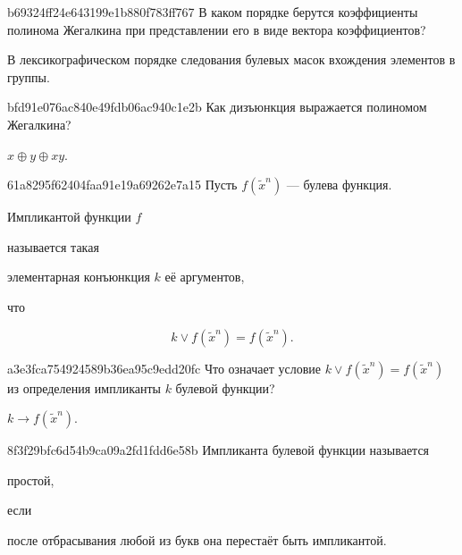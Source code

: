 \begin{note}{b69324ff24e643199e1b880f783ff767}
    В каком порядке берутся коэффициенты полинома Жегалкина при представлении его в виде вектора коэффициентов?

    \begin{cloze}{1}
        В лексикографическом порядке следования булевых масок вхождения элементов в группы.
    \end{cloze}
\end{note}

\begin{note}{bfd91e076ac840e49fdb06ac940c1e2b}
    Как дизъюнкция выражается полиномом Жегалкина?

    \begin{cloze}{1}
        \({ x \oplus y \oplus xy }\).
    \end{cloze}
\end{note}

\begin{note}{61a8295f62404faa91e19a69262e7a15}
    Пусть \({ f(\widetilde x^{n}) }\) --- булева функция.
    \begin{icloze}{3}Импликантой функции \({ f }\)\end{icloze} называется такая \begin{icloze}{2}элементарная конъюнкция \({ k }\) её аргументов,\end{icloze} что
    \begin{icloze}{1}
        \[
            k \lor f(\widetilde x^{n}) = f(\widetilde x^{n}).
        \]
    \end{icloze}
\end{note}

\begin{note}{a3e3fca754924589b36ea95c9edd20fc}
    Что означает условие \({ k \lor f(\widetilde x^{n}) = f(\widetilde x^{n}) }\) из определения импликанты \({ k }\) булевой функции?

    \begin{cloze}{1}
        \({ k \to f(\widetilde x^{n}) }\).
    \end{cloze}
\end{note}

\begin{note}{8f3f29bfc6d54b9ca09a2fd1fdd6e58b}
    Импликанта булевой функции называется \begin{icloze}{2}простой,\end{icloze} если \begin{icloze}{1}после отбрасывания любой из букв она перестаёт быть импликантой.\end{icloze}
\end{note}

